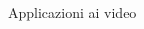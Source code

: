 \documentclass{beamer}
\begin{document}
\begin{frame}{Applicazioni ai video}
\begin{columns}[T]
\begin{column}{.33\textwidth}
\begin{center}
            \end{center}
        \end{column}%
        \begin{column}{.33\textwidth}
            \begin{center}
            \end{center}
        \end{column}
    \end{columns}


\end{frame}
\end{document}
